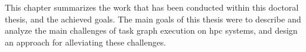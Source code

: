 This chapter summarizes the work that has been conducted within this doctoral thesis, and the
achieved goals. The main goals of this thesis were to describe and analyze the main challenges of
task graph execution on \gls{hpc} systems, and design an approach for alleviating these
challenges.

